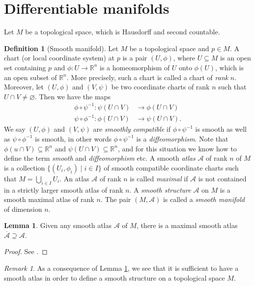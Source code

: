 \documentclass[12pt]{amsart}
\numberwithin{equation}{section}
\theoremstyle{plain}
\theoremstyle{definition}
\newtheorem{defn}{Definition}[subsection]
\newtheorem{lem}{Lemma}[subsection]
\theoremstyle{remark}
\newtheorem{rem}{Remark}[subsection]
\newcommand{\R}{\mathbb{R}}
\newcommand{\calA}{\mathcal{A}}
\begin{document}
\section{Differentiable manifolds}
Let $M$ be a topological space, which is Hausdorff and second countable.
\begin{defn}[Smooth manifold]
Let $M$ be a topological space and $p\in M$. A chart (or local coordinate system) at $p$ is a pair $(U,\phi)$, where $U\subseteq M$ is an open set containing $p$ and $\phi\colon U\to \R^n$ is a homeomorphism of $U$ onto $\phi(U)$, which is an open subset of $\R^n$. More precisely, such a chart is called a chart of \emph{rank} $n$. Moreover, let $(U,\phi)$ and $(V,\psi)$ be two coordinate charts of rank $n$ such that $U\cap V\not=\varnothing$. Then we have the maps
\begin{align*}
\phi\circ\psi^{-1}\colon \psi(U\cap V)&\to \phi(U\cap V)\\
\psi\circ\phi^{-1}\colon \phi(U\cap V)&\to \psi(U\cap V).
\end{align*}
We say $(U,\phi)$ and $(V,\psi)$ are \emph{smoothly compatible} if $\phi\circ\psi^{-1}$ is smooth as well as $\psi\circ \phi^{-1}$ is smooth, in other words $\phi\circ\psi^{-1}$ is a \emph{diffeomorphism}. Note that $\phi(u\cap V)\subseteq \R^n$ and $\psi(U\cap V)\subseteq\R^n$, and for this situation we know how to define the term \emph{smooth} and \emph{diffeomorphism} etc. A smooth \emph{atlas} $\calA$ of rank $n$ of $M$ is a collection $\{(U_i,\phi_i)\mid i\in I\}$ of smooth compatible coordinate charts such that $M=\bigcup_{i\in I}U_i$. An atlas $\calA$ of rank $n$ is called \emph{maximal} if $\calA$ is not contained in a strictly larger smooth atlas of rank $n$. A \emph{smooth structure} $\calA$ on $M$ is a smooth maximal atlas of rank $n$. The pair $(M,\calA)$ is called a \emph{smooth manifold} of dimension $n$.
\end{defn}

\begin{lem}
\label{atlas}
Given any smooth atlas $\calA$ of $M$, there is a maximal smooth atlas $\overline{\calA}\supseteq \calA$.
\end{lem}

\begin{proof}
See \cite{Lee}.
\end{proof}

\begin{rem}
As a consequence of Lemma \ref{atlas}, we see that it is sufficient to have a smooth atlas in order to define a smooth structure on a topological space $M$.
\end{rem}
\end{document}
